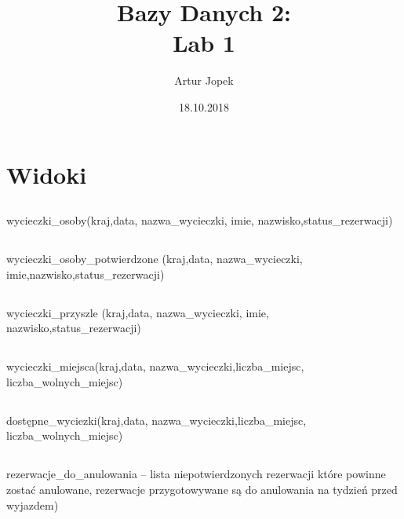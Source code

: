 \documentclass[12pt]{article}
\begin{document}
\title{Bazy Danych 2:\\Lab 1}
\author{Artur Jopek}
\date{18.10.2018}
\maketitle


\maketitle

\section{Widoki}
\subsection{}
wycieczki\_osoby(kraj,data, nazwa\_wycieczki, imie, nazwisko,status\_rezerwacji)

\subsection{}
wycieczki\_osoby\_potwierdzone (kraj,data, nazwa\_wycieczki, imie,nazwisko,status\_rezerwacji)

\subsection{}
wycieczki\_przyszle (kraj,data, nazwa\_wycieczki, imie, nazwisko,status\_rezerwacji)

\subsection{}
wycieczki\_miejsca(kraj,data, nazwa\_wycieczki,liczba\_miejsc, liczba\_wolnych\_miejsc)

\subsection{}
dostępne\_wyciezki(kraj,data, nazwa\_wycieczki,liczba\_miejsc, liczba\_wolnych\_miejsc)

\subsection{}
rezerwacje\_do\_anulowania – lista niepotwierdzonych rezerwacji które powinne zostać
anulowane, rezerwacje przygotowywane są do anulowania na tydzień przed wyjazdem)

\end{document}
